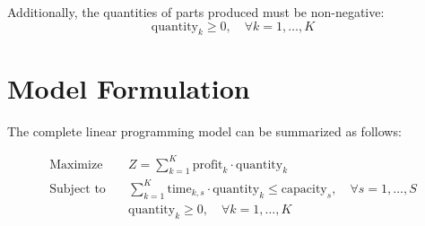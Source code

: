 \documentclass{article}
\begin{document}
Additionally, the quantities of parts produced must be non-negative:
\[
\text{quantity}_{k} \geq 0, \quad \forall k = 1, \ldots, K
\]

\section*{Model Formulation}
The complete linear programming model can be summarized as follows:

\begin{align*}
\text{Maximize} \quad & Z = \sum_{k=1}^{K} \text{profit}_{k} \cdot \text{quantity}_{k} \\
\text{Subject to} \quad & \sum_{k=1}^{K} \text{time}_{k,s} \cdot \text{quantity}_{k} \leq \text{capacity}_{s}, \quad \forall s = 1, \ldots, S \\
& \text{quantity}_{k} \geq 0, \quad \forall k = 1, \ldots, K
\end{align*}
\end{document}
